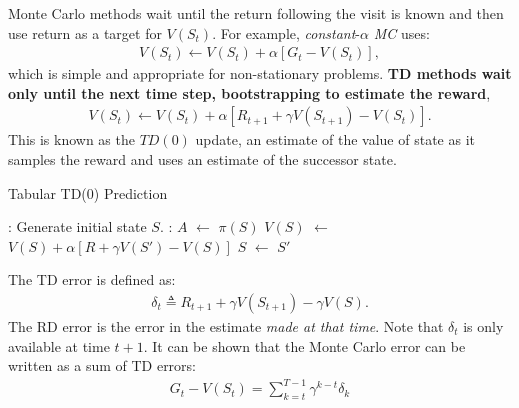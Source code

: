 \documentclass{article}
\newcommand*\Let[2]{\State #1 $\gets$ #2}
\newcommand{\ix}[1]{%
  \leavevmode %
  \marginpar{\small\emph{#1}}%
}
\begin{document}
\ix{TD Prediction}Monte Carlo methods wait until the return following the visit is known and then use return as a target for $V(S_t)$. For example, \emph{constant}-$\alpha$ \emph{MC} uses:
\begin{align}
V(S_t) \leftarrow V(S_t) + \alpha [G_t - V(S_t)],
\end{align}
which is simple and appropriate for non-stationary problems. \textbf{TD methods wait only until the next time step, bootstrapping to estimate the reward}, 
\begin{align}
V(S_t) \leftarrow V(S_t) + \alpha [R_{t+1} +\gamma V(S_{t+1}) - V(S_t)].
\end{align}
This is known as the $TD(0)$ update, an estimate of the value of state as it samples the reward and uses an estimate of the successor state. 

\begin{algorithm}[H]
	\caption{Tabular TD(0) Prediction
		\label{alg:tab_td_zero}}
	\begin{algorithmic}[1]
		\Statex 
		\Statex
		: 
		\State Generate initial state $S$. 
		:
		\Let{$A$}{$ \pi(S) $} 
		\State {}
		\Let{$V(S)$}{$V(S) + \alpha [R +\gamma V(S') - V(S)]$}
		\Let{$S$}{$S'$}
		\EndWhile
		\EndFor
	\end{algorithmic}
\end{algorithm}

\ix{TD Error}The TD error is defined as:
\begin{align}
\delta_t \triangleq R_{t+1} + \gamma V(S_{t+1}) - \gamma V(S).
\end{align}
The RD error is the error in the estimate \emph{made at that time}. Note that $\delta_t$ is only available at time $t+1$. It can be shown that the Monte Carlo error can be written as a sum of TD errors:
\begin{align}
G_t - V(S_t) = \sum_{k=t}^{T-1} \gamma^{k-t} \delta_k
\end{align}
\end{document}
